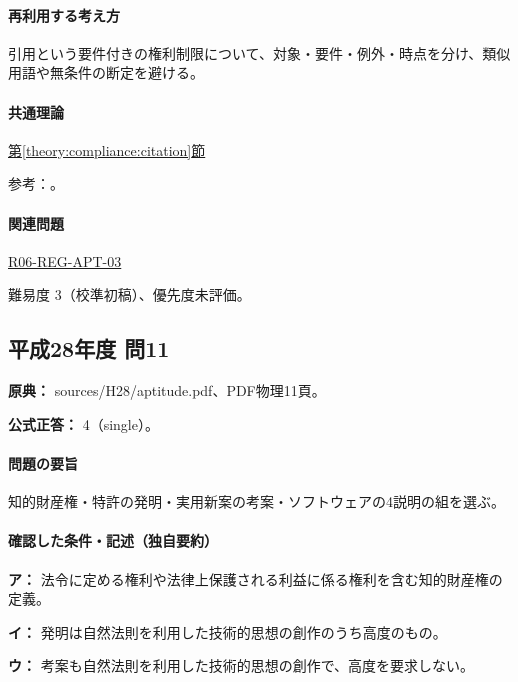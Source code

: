 \paragraph{再利用する考え方} 引用という要件付きの権利制限について、対象・要件・例外・時点を分け、類似用語や無条件の断定を避ける。

\paragraph{共通理論} \hyperref[theory:compliance:citation]{第\ref*{theory:compliance:citation}節}

\par 参考：\cite{bunka_citation_faq,kyushu_copyright2015}。

\paragraph{関連問題} \hyperref[q:r06-reg-apt-03]{R06-REG-APT-03}

\par 難易度 3（校準初稿）、優先度未評価。

\subsection{平成28年度 問11}
\label{q:h28-reg-apt-11}

\noindent\textbf{原典：} sources/H28/aptitude.pdf、PDF物理11頁。

\textbf{公式正答：} 4（single）。

\paragraph{問題の要旨} 知的財産権・特許の発明・実用新案の考案・ソフトウェアの4説明の組を選ぶ。

\paragraph{確認した条件・記述（独自要約）}\mbox{}\par

\noindent\textbf{ア：} 法令に定める権利や法律上保護される利益に係る権利を含む知的財産権の定義。\par

\noindent\textbf{イ：} 発明は自然法則を利用した技術的思想の創作のうち高度のもの。\par

\noindent\textbf{ウ：} 考案も自然法則を利用した技術的思想の創作で、高度を要求しない。\par

